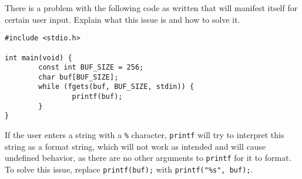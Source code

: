 There is a problem with the following code as written that will manifest itself for certain user input. Explain what this issue is and how to solve it.

\begin{verbatim}
#include <stdio.h>

int main(void) {
        const int BUF_SIZE = 256;
        char buf[BUF_SIZE];
        while (fgets(buf, BUF_SIZE, stdin)) {
                printf(buf);
        }
}
\end{verbatim}

\begin{answer}
If the user enters a string with a \texttt{\%} character, \texttt{printf} will try to interpret this string as a format string, which will not work as intended and will cause undefined behavior, as there are no other arguments to \texttt{printf} for it to format. To solve this issue, replace \texttt{printf(buf);} with \texttt{printf("\%s", buf);}.
\end{answer}
